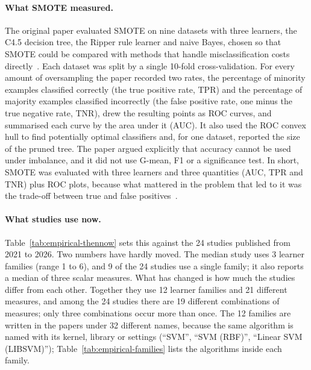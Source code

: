 \paragraph{What SMOTE measured.} The original paper evaluated SMOTE on nine datasets with three learners, the C4.5 decision tree, the Ripper rule learner and naive Bayes, chosen so that SMOTE could be compared with methods that handle misclassification costs directly~\parencite{chawla2002smote}. Each dataset was split by a single 10-fold cross-validation. For every amount of oversampling the paper recorded two rates, the percentage of minority examples classified correctly (the true positive rate, TPR) and the percentage of majority examples classified incorrectly (the false positive rate, one minus the true negative rate, TNR), drew the resulting points as ROC curves, and summarised each curve by the area under it (AUC). It also used the ROC convex hull to find potentially optimal classifiers and, for one dataset, reported the size of the pruned tree. The paper argued explicitly that accuracy cannot be used under imbalance, and it did not use G-mean, F1 or a significance test. In short, SMOTE was evaluated with three learners and three quantities (AUC, TPR and TNR) plus ROC plots, because what mattered in the problem that led to it was the trade-off between true and false positives~\parencite{fernandez2018smote}.

\paragraph{What studies use now.} Table~\ref{tab:empirical-thennow} sets this against the 24 studies published from 2021 to 2026. Two numbers have hardly moved. The median study uses 3 learner families (range 1 to 6), and 9 of the 24 studies use a single family; it also reports a median of three scalar measures. What has changed is how much the studies differ from each other. Together they use 12 learner families and 21 different measures, and among the 24 studies there are 19 different combinations of measures; only three combinations occur more than once. The 12 families are written in the papers under 32 different names, because the same algorithm is named with its kernel, library or settings (``SVM'', ``SVM (RBF)'', ``Linear SVM (LIBSVM)''); Table~\ref{tab:empirical-families} lists the algorithms inside each family.






